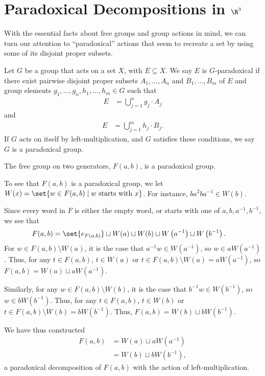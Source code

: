 \section{Paradoxical Decompositions in $\R^3$}%
With the essential facts about free groups and group actions in mind, we can turn our attention to ``paradoxical'' actions that seem to recreate a set by using some of its disjoint proper subsets.
\begin{definition}
  Let $G$ be a group that acts on a set $X$, with $E\subseteq X$. We say $E$ is $G${-paradoxical} if there exist pairwise disjoint proper subsets $A_1,\dots,A_n$ and $B_1,\dots,B_m$ of $E$ and group elements $g_1,\dots,g_n,h_1,\dots,h_m\in G$ such that
  \begin{align*}
    E &= \bigcup_{j=1}^{n}g_j\cdot A_j
  \end{align*}
  and
  \begin{align*}
    E &= \bigcup_{j=1}^{m}h_j\cdot B_j.
  \end{align*}
  If $G$ acts on itself by left-multiplication, and $G$ satisfies these conditions, we say $G$ is a {paradoxical group}.
\end{definition}
\begin{example}
  The free group on two generators, $F(a,b)$, is a paradoxical group.\newline

  To see that $F(a,b)$ is a paradoxical group, we let $W(x) = \set{w\in F(a,b)\mid w\text{ starts with }x}$. For instance, $ba^2ba^{-1}\in W(b)$.\newline

  Since every word in $F$ is either the empty word, or starts with one of $a,b,a^{-1},b^{-1}$, we see that
  \begin{align*}
    F(a,b) &= \set{e_{F(a,b)}} \sqcup W(a) \sqcup W(b) \sqcup W\left(a^{-1}\right) \sqcup W\left(b^{-1}\right).
  \end{align*}
  For $w\in F(a,b)\setminus W(a)$, it is the case that $a^{-1}w\in W\left(a^{-1}\right)$, so $w\in aW\left(a^{-1}\right)$. Thus, for any $t\in F(a,b)$, $t\in W(a)$ or $t\in F(a,b)\setminus W(a) = aW\left(a^{-1}\right)$, so $F(a,b) = W(a)\sqcup aW\left(a^{-1}\right)$.

  Similarly, for any $w\in F(a,b)\setminus W(b)$, it is the case that $b^{-1}w\in W\left(b^{-1}\right)$, so $w\in bW\left(b^{-1}\right)$. Thus, for any $t\in F(a,b)$, $t\in W(b)$ or $t\in F(a,b) \setminus W(b) = bW\left(b^{-1}\right)$. Thus, $F(a,b) = W(b)\sqcup bW\left(b^{-1}\right)$.\newline

  We have thus constructed
  \begin{align*}
    F(a,b) &= W(a)\sqcup aW\left(a^{-1}\right)\\
           &= W(b)\sqcup bW\left(b^{-1}\right),
  \end{align*}
  a paradoxical decomposition of $F(a,b)$ with the action of left-multiplication.
\end{example}

